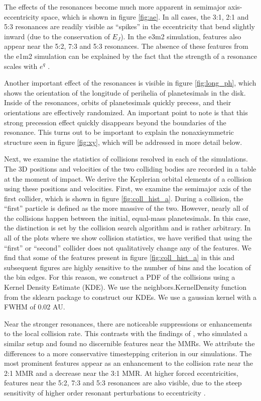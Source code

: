 \documentclass[twocolumn]{aastex63}
\begin{document}
The effects of the resonances become much more apparent in semimajor axis-eccentricity space, which is shown in figure \ref{fig:ae}. In all cases, 
the 3:1, 2:1 and 5:3 resonances are readily visible as ``spikes'' in the eccentricity that bend slightly inward (due to the conservation of $E_{J}$). In the 
e3m2 simulation, features also appear near the 5:2, 7:3 and 5:3 resonances. The absence of these features from the e1m2 simulation can be 
explained by the fact that the strength of a resonance scales with $e^{q}$ \citep{1994PhyD...77..289M}.

Another important effect of the resonances is visible in figure \ref{fig:long_ph}, which shows the orientation of the longitude of perihelia of 
planetesimals in the disk. Inside of the resonances, orbits of planetesimals quickly precess, and their orientations are effectively randomized. An 
important point to note is that this strong precession effect quickly disappears beyond the boundaries of the resonance. This turns out to be 
important to explain the nonaxisymmetric structure seen in figure \ref{fig:xy}, which will be addressed in more detail below.

Next, we examine the statistics of collisions resolved in each of the simulations. The 3D positions and velocities of the two colliding bodies are 
recorded in a table at the moment of impact. We derive the Keplerian orbital elements of a collision using these positions and velocities. 
First, we examine the semimajor axis of the first collider, which is shown in figure \ref{fig:coll_hist_a}. During a collision, the ``first'' particle is defined 
as the more massive of the two. However, nearly all of the collisions happen between the initial, equal-mass planetesimals. In this case, the 
distinction is set by the collision search algorithm and is rather arbitrary. In all of the plots where we show collision statistics, we have verified that 
using the ``first'' or ``second'' collider does not qualitatively change any of the features. We find that some of the features present in figure 
\ref{fig:coll_hist_a} in this and subsequent figures are highly sensitive to the number of bins and the location of the bin edges. For this reason, we 
construct a PDF of the collisions using a Kernel Density Estimate (KDE). We use the {\sc neighbors.KernelDensity} function from the {\sc sklearn} 
\citep{scikit-learn} package to construct our KDEs. We use a gaussian kernel with a FWHM of 0.02 AU.

Near the stronger resonances, there are noticeable suppressions or enhancements to the local collision rate. This contrasts with the findings of 
\citet{2000Icar..143...45R}, who simulated a similar setup and found no discernible features near the MMRs. We attribute the differences to a more 
conservative timestepping criterion in our simulations. The most prominent features appear as an enhancement to the collision rate near the 2:1 
MMR and a decrease near the 3:1 MMR. At higher forced eccentricities, features near the 5:2, 7:3 and 5:3 resonances are also visible, due to the 
steep sensitivity of higher order resonant perturbations to eccentricity \citep{1994PhyD...77..289M}.
\end{document}
